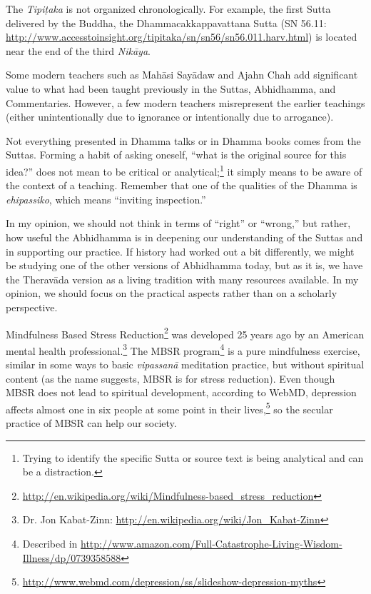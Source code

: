 
The \textit{Tipiṭaka} is not organized chronologically. For example, the first Sutta delivered by the Buddha, the Dhammacakkappavattana Sutta (SN 56.11: \url{http://www.accesstoinsight.org/tipitaka/sn/sn56/sn56.011.harv.html}) is located near the end of the third \textit{Nikāya}.


Some modern teachers such as Mahāsi Sayādaw and Ajahn Chah add significant value to what had been taught previously in the Suttas, Abhidhamma, and Commentaries. However, a few modern teachers misrepresent the earlier teachings (either unintentionally due to ignorance or intentionally due to arrogance).

Not everything presented in Dhamma talks or in Dhamma books comes from the Suttas. Forming a habit of asking oneself, “what is the original source for this idea?” does not mean to be critical or analytical;\footnote{Trying to identify the specific Sutta or source text is being analytical and can be a distraction.} it simply means to be aware of the context of a teaching. Remember that one of the qualities of the Dhamma is \textit{ehipassiko}, which means “inviting inspection.” 


In my opinion, we should not think in terms of “right” or “wrong,” but rather, how useful the Abhidhamma is in deepening our understanding of the Suttas and in supporting our practice. If history had worked out a bit differently, we might be studying one of the other versions of Abhidhamma today, but as it is, we have the Theravāda version as a living tradition with many resources available. In my opinion, we should focus on the practical aspects rather than on a scholarly perspective.


Mindfulness Based Stress Reduction\footnote{\url{http://en.wikipedia.org/wiki/Mindfulness-based_stress_reduction}} was developed 25 years ago by an American mental health professional.\footnote{Dr. Jon Kabat-Zinn: \url{http://en.wikipedia.org/wiki/Jon_Kabat-Zinn}} The MBSR program\footnote{Described in \url{http://www.amazon.com/Full-Catastrophe-Living-Wisdom-Illness/dp/0739358588}} is a pure mindfulness exercise, similar in some ways to basic \textit{vipassanā} meditation practice, but without spiritual content (as the name suggests, MBSR is for stress reduction). Even though MBSR does not lead to spiritual development, according to WebMD, depression affects almost one in six people at some point in their lives,\footnote{\url{http://www.webmd.com/depression/ss/slideshow-depression-myths}} so the secular practice of MBSR can help our society. 

